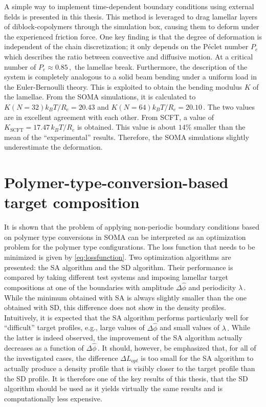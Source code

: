 \documentclass[bachelor,       %
               oneside,        %
               BCOR10mm,       %
               ngerman, english %
               ]{GAUBM}
\begin{document}
A simple way to implement time-dependent boundary conditions using external fields is presented in this thesis. This method is leveraged to drag lamellar layers of diblock-copolymers through the simulation box, causing them to deform under the experienced friction force. One key finding is that the degree of deformation is independent of the chain discretization; it only depends on the P\'eclet number $P_e$ which describes the ratio between convective and diffusive motion. At a critical number of $P_e\approx 0.85\,,$ the lamellae break. Furthermore, the description of the system is completely analogous to a solid beam bending under a uniform load in the Euler-Bernoulli theory. This is exploited to obtain the bending modulus $K$ of the lamellae. From the \ac{SOMA} simulations, it is calculated to $K(N=32)k_BT/R_e=20.43$ and $K(N=64)k_BT/R_e=20.10\,.$ The two values are in excellent agreement with each other. From \ac{SCFT}, a value of $K_\text{SCFT}=17.47\,k_BT/R_e$ is obtained. This value is about $14\%$ smaller than the mean of the \enquote{experimental} results. Therefore, the \ac{SOMA} simulations slightly underestimate the deformation.

\section{Polymer-type-conversion-based target composition}

It is shown that the problem of applying non-periodic boundary conditions based on polymer type conversions in \ac{SOMA} can be interpreted as an optimization problem for the polymer type configurations. The loss function that needs to be minimized is given by \autoref{eq:lossfunction}. Two optimization algorithms are presented: the \ac{SA} algorithm and the \ac{SD} algorithm. Their performance is compared by taking different test systems and imposing lamellar target compositions at one of the boundaries with amplitude $\Delta\hat\phi$ and periodicity $\lambda\,.$ While the minimum obtained with \ac{SA} is always slightly smaller than the one obtained with \ac{SD}, this difference does not show in the density profiles. Intuitively, it is expected that the \ac{SA} algorithm performs particularly well for \enquote{difficult} target profiles, e.g., large values of $\Delta\hat\phi$ and small values of $\lambda\,.$ While the latter is indeed observed, the improvement of the \ac{SA} algorithm actually decreases as a function of $\Delta\hat\phi\,.$ It should, however, be emphasized that, for all of the investigated cases, the difference $\Delta L_{opt}$ is too small for the \ac{SA} algorithm to actually produce a density profile that is visibly closer to the target profile than the \ac{SD} profile. It is therefore one of the key results of this thesis, that the \ac{SD} algorithm should be used as it yields virtually the same results and is computationally less expensive. \\
\end{document}
